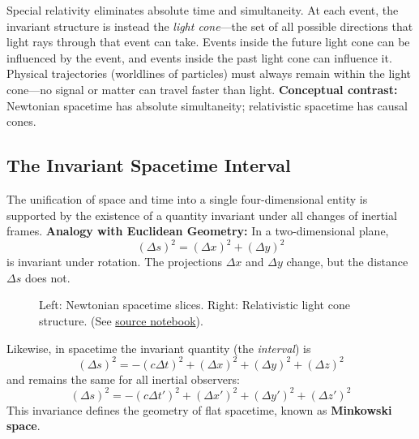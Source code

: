 \documentclass[11pt, a4paper]{report}
\begin{document}
Special relativity eliminates absolute time and simultaneity.  
At each event, the invariant structure is instead the \emph{light cone}—the set of all possible directions that light rays through that event can take.
Events inside the future light cone can be influenced by the event, and events inside the past light cone can influence it.  
Physical trajectories (worldlines of particles) must always remain within the light cone—no signal or matter can travel faster than light.
\newline
\textbf{Conceptual contrast:} Newtonian spacetime has absolute simultaneity; relativistic spacetime has causal cones.
\subsection*{The Invariant Spacetime Interval}
The unification of space and time into a single four-dimensional entity is supported by the existence of a quantity invariant under all changes of inertial frames.
\newline
\textbf{Analogy with Euclidean Geometry:}
In a two-dimensional plane,
\[
(\Delta s)^2 = (\Delta x)^2 + (\Delta y)^2
\]
is invariant under rotation.  
The projections $\Delta x$ and $\Delta y$ change, but the distance $\Delta s$ does not.
\begin{figure}
  \centering
  \vspace{-10pt}

  \begin{minipage}{0.48\linewidth}
    
  \end{minipage}
  \hfill
  \begin{minipage}{0.48\linewidth}
    
  \end{minipage}

  \caption{Left: Newtonian spacetime slices. Right: Relativistic light cone structure.  
  (See \href{https://github.com/Abdulrahman-MA/GeneralRelativityGraduationProject/blob/main/ChapterOnePlots.ipynb}{source notebook}).}
  \vspace{-10pt}
\end{figure}
Likewise, in spacetime the invariant quantity (the \emph{interval}) is
\[
(\Delta s)^2 = - (c \Delta t)^2 + (\Delta x)^2 + (\Delta y)^2 + (\Delta z)^2
\]
and remains the same for all inertial observers:
\[
(\Delta s)^2 = - (c \Delta t')^2 + (\Delta x')^2 + (\Delta y')^2 + (\Delta z')^2
\]
This invariance defines the geometry of flat spacetime, known as \textbf{Minkowski space}.
\newline
\end{document}
